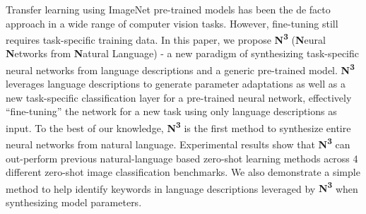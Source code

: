 Transfer learning using ImageNet pre-trained models has been the de facto approach in a wide range of computer vision tasks. However, fine-tuning still requires task-specific training data. In this paper, we propose \textbf{N\textsuperscript{3}} (\textbf{N}eural \textbf{N}etworks from \textbf{N}atural Language) - a new paradigm of synthesizing task-specific neural networks from language descriptions and a generic pre-trained model. \textbf{N\textsuperscript{3}} leverages language descriptions to generate parameter adaptations as well as a new task-specific classification layer for a pre-trained neural network, effectively ``fine-tuning'' the network for a new task using only language descriptions as input. To the best of our knowledge, \textbf{N\textsuperscript{3}} is the first method to synthesize entire neural networks from natural language. Experimental results show that \textbf{N\textsuperscript{3}} can out-perform previous natural-language based zero-shot learning methods across 4 different zero-shot image classification benchmarks. We also demonstrate a simple method to help identify keywords in language descriptions leveraged by \textbf{N\textsuperscript{3}} when synthesizing model parameters.
